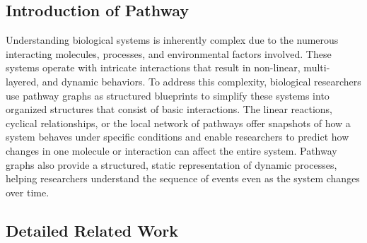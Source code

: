 




\subsection{Introduction of Pathway}

Understanding biological systems is inherently complex due to the numerous interacting molecules, processes, and environmental factors involved. These systems operate with intricate interactions that result in non-linear, multi-layered, and dynamic behaviors. To address this complexity, biological researchers use pathway graphs as structured blueprints to simplify these systems into organized structures that consist of basic interactions. The linear reactions, cyclical relationships, or the local network of pathways offer snapshots of how a system behaves under specific conditions and enable researchers to predict how changes in one molecule or interaction can affect the entire system. Pathway graphs also provide a structured, static representation of dynamic processes, helping researchers understand the sequence of events even as the system changes over time. 

\subsection{Detailed Related Work} \label{appendix related work}

